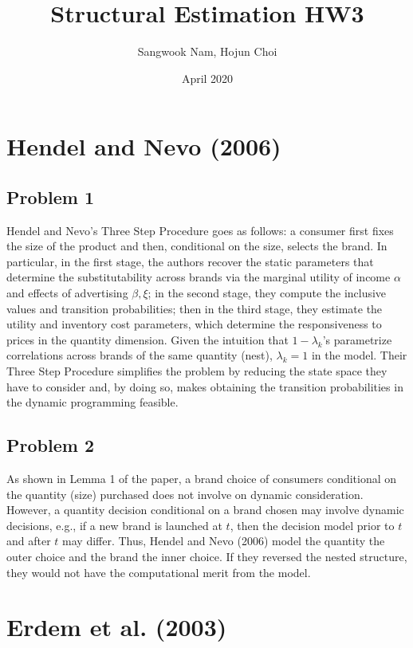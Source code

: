 \documentclass{article}
\title{Structural Estimation HW3}
\author{Sangwook Nam, Hojun Choi}
\date{April 2020}
\begin{document}
\maketitle

\section*{Hendel and Nevo (2006)}
\subsection*{Problem 1}
Hendel and Nevo's Three Step Procedure goes as follows: a consumer first fixes the size of the product and then, conditional on the size, selects the brand. In particular, in the first stage, the authors recover the static parameters that determine the substitutability across brands via the marginal utility of income $\alpha$ and effects of advertising $\beta, \xi$; in the second stage, they compute the inclusive values and transition probabilities; then in the third stage, they estimate the utility and inventory cost parameters, which determine the responsiveness to prices in the quantity dimension.
\newline
\newline
Given the intuition that $1- \lambda_{k}$'s parametrize correlations across brands of the same quantity (nest), $\lambda_{k}=1$ in the model.
\newline
\newline
Their Three Step Procedure simplifies the problem by reducing the state space they have to consider and, by doing so, makes obtaining the transition probabilities in the dynamic programming feasible.

\subsection*{Problem 2}
As shown in Lemma 1 of the paper, a brand choice of consumers conditional on the quantity (size) purchased does not involve on dynamic consideration. However, a quantity decision conditional on a brand chosen may involve dynamic decisions, e.g., if a new brand is launched at $t$, then the decision model prior to $t$ and after $t$ may differ. Thus, Hendel and Nevo (2006) model the quantity the outer choice and the brand the inner choice. If they reversed the nested structure, they would not have the computational merit from the model.

\section*{Erdem et al. (2003)}
\end{document}
